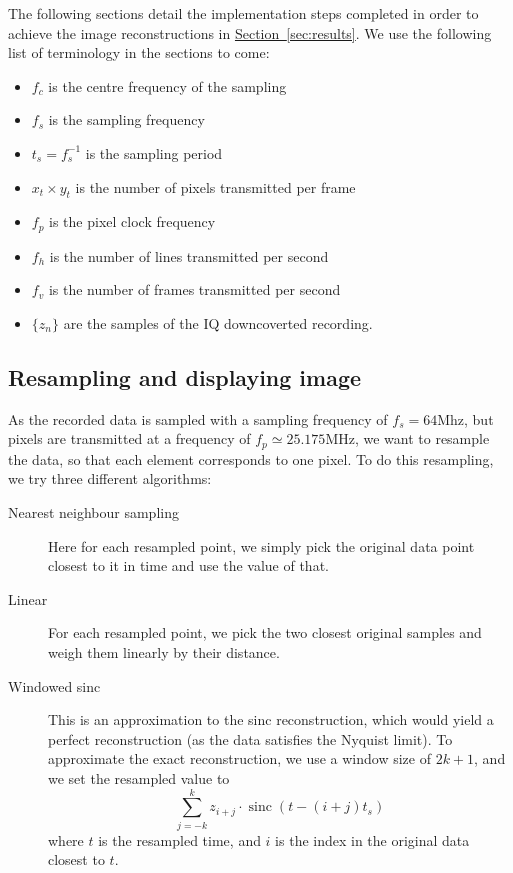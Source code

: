 \documentclass{article}
\DeclareMathOperator{\sinc}{sinc}
\newcommand{\sectionref}[1]{\hyperref[sec:#1]{Section~\ref*{sec:#1}}}
\begin{document}
The following sections detail the implementation steps completed in order to achieve the image reconstructions in \sectionref{results}. We use the following list of terminology in the sections to come:
\begin{itemize}[noitemsep,topsep=0pt]
    \item $f_c$ is the centre frequency of the sampling
    \item $f_s$ is the sampling frequency
    \item $t_s = f_s^{-1}$ is the sampling period
    \item $x_t \times y_t$ is the number of pixels transmitted per frame
    \item $f_p$ is the pixel clock frequency
    \item $f_h$ is the number of lines transmitted per second
    \item $f_v$ is the number of frames transmitted per second
    \item $\{z_n\}$ are the samples of the IQ downcoverted recording.
\end{itemize}

\subsection{Resampling and displaying image}
\label{sec:resampling}

As the recorded data is sampled with a sampling frequency of $f_s = 64$Mhz, but pixels are transmitted at a frequency of $f_p \simeq 25.175$MHz, we want to resample the data, so that each element corresponds to one pixel. To do this resampling, we try three different algorithms:

\begin{description}

\item[Nearest neighbour sampling] Here for each resampled point, we simply pick the original data point closest to it in time and use the value of that.
\item[Linear] For each resampled point, we pick the two closest original samples and weigh them linearly by their distance.
\item[Windowed sinc] This is an approximation to the sinc reconstruction, which would yield a perfect reconstruction (as the data satisfies the Nyquist limit). To approximate the exact reconstruction, we use a window size of $2k+1$, and we set the resampled value to 
$$
\sum\limits_{j=-k}^{k}z_{i+j} \cdot \sinc(t - (i+j) t_s)
$$
where $t$ is the resampled time, and $i$ is the index in the original data closest to $t$.
 
\end{description}
\end{document}
